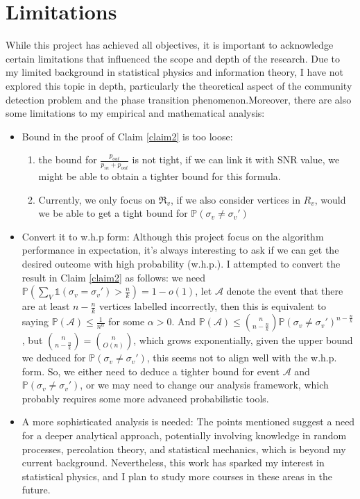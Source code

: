 \section{Limitations}
While this project has achieved all objectives, it is important to acknowledge certain limitations that influenced the scope and depth of the research. Due to my limited background in statistical physics and information theory, I have not explored this topic in depth, particularly the theoretical aspect of the community detection problem and the phase transition phenomenon.Moreover, there are also some limitations to my empirical and mathematical analysis:
\begin{itemize}
    \item Bound in the proof of Claim \ref{claim2} is too loose: \begin{enumerate}
        \item the bound for $\frac{p_{out}}{p_{in}+p_{out}}$ is not tight, if we can link it with SNR value, we might be able to obtain a tighter bound for this formula.
        \item Currently, we only focus on $\Re_v$, if we also consider vertices in $R_v$, would we be able to get a tight bound for $\mathbb{P}(\sigma_v\neq\sigma_{v}')$
    \end{enumerate}
    \item Convert it to w.h.p form: Although this project focus on the algorithm performance in expectation, it's always interesting to ask if we can get the desired outcome with high probability (w.h.p.). I attempted to convert the result in Claim \ref{claim2} as follows: we need $\mathbb{P}(\sum_V\mathbb{1}(\sigma_v=\sigma_{v}')>\frac{n}{k})=1-o(1)$, let $\mathcal{A}$ denote the event that there are at least $n-\frac{n}{k}$ vertices labelled incorrectly, then this is equivalent to saying $\mathbb{P}(\mathcal{A})\leq \frac{1}{n^{\alpha}}$ for some $\alpha>0.$ And $\mathbb{P}(\mathcal{A})\leq\binom{n}{n-\frac{n}{k}}\mathbb{P}(\sigma_v\neq\sigma_{v}')^{n-\frac{n}{k}}$, but $\binom{n}{n-\frac{n}{k}}=\binom{n}{O(n)}$, which grows exponentially, given the upper bound we deduced for $\mathbb{P}(\sigma_v\neq\sigma_{v}')$, this seems not to align well with the w.h.p. form. So, we either need to deduce a tighter bound for event $\mathcal{A}$ and $\mathbb{P}(\sigma_v \neq \sigma_{v}')$, or we may need to change our analysis framework, which probably requires some more advanced probabilistic tools.
    \item A more sophisticated analysis is needed: The points mentioned suggest a need for a deeper analytical approach, potentially involving knowledge in random processes, percolation theory, and statistical mechanics, which is beyond my current background. Nevertheless, this work has sparked my interest in statistical physics, and I plan to study more courses in these areas in the future.

\end{itemize}
